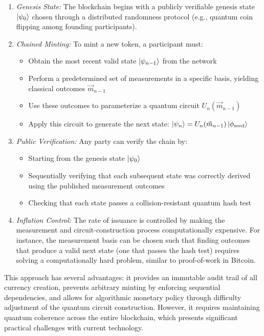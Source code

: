 \documentclass[a4paper,10.5pt,twoside]{article}
\begin{document}
\begin{enumerate}
\item \textit{Genesis State:} The blockchain begins with a publicly verifiable genesis state $\ket{\psi_0}$ chosen through a distributed randomness protocol (e.g., quantum coin flipping among founding participants).

\item \textit{Chained Minting:} To mint a new token, a participant must:
\begin{itemize}
    \item Obtain the most recent valid state $\ket{\psi_{n-1}}$ from the network
    \item Perform a predetermined set of measurements in a specific basis, yielding classical outcomes $\vec{m}_{n-1}$
    \item Use these outcomes to parameterize a quantum circuit $U_n(\vec{m}_{n-1})$
    \item Apply this circuit to generate the next state: $\ket{\psi_n} = U_n(\vec{m}_{n-1}) \ket{\phi_{\text{seed}}}$
\end{itemize}

\item \textit{Public Verification:} Any party can verify the chain by:
\begin{itemize}
    \item Starting from the genesis state $\ket{\psi_0}$
    \item Sequentially verifying that each subsequent state was correctly derived using the published measurement outcomes
    \item Checking that each state passes a collision-resistant quantum hash test
\end{itemize}

\item \textit{Inflation Control:} The rate of issuance is controlled by making the measurement and circuit-construction process computationally expensive. For instance, the measurement basis can be chosen such that finding outcomes that produce a valid next state (one that passes the hash test) requires solving a computationally hard problem, similar to proof-of-work in Bitcoin.
\end{enumerate}

This approach has several advantages: it provides an immutable audit trail of all currency creation, prevents arbitrary minting by enforcing sequential dependencies, and allows for algorithmic monetary policy through difficulty adjustment of the quantum circuit construction. However, it requires maintaining quantum coherence across the entire blockchain, which presents significant practical challenges with current technology.
\end{document}
